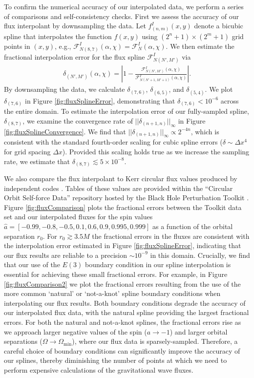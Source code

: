 \documentclass[%
 reprint,
 nofootinbib,
 amsmath,amssymb,
 aps,
 prd,
]{revtex4-2}
\begin{document}
To confirm the numerical accuracy of our interpolated data, we perform a series of comparisons and self-consistency checks. First we assess the accuracy of our flux interpolant by downsampling the data. Let $f^I_{(n,m)}(x,y)$ denote a bicubic spline that interpolates the function $f(x,y)$ using $(2^n+1) \times (2^m+1)$ grid points in $(x,y)$, e.g., $\mathcal{F}_{N(8,7)}^I(\alpha, \chi) = \mathcal{F}_N^I(\alpha, \chi) $. We then estimate the fractional interpolation error for the flux spline $\mathcal{F}_{N(N',M')}^I$ via
\begin{align}
    \delta_{(N',M')}(\alpha, \chi) = \left|1 - \frac{\mathcal{F}_{N(N',M')}^I(\alpha, \chi)}{\mathcal{F}_{N(N'+1,M'+1)}^I(\alpha, \chi)} \right|.
\end{align}
By downsampling the data, we calculate $\delta_{(7,6)}$, $\delta_{(6,5)}$, and $\delta_{(5,4)}$. We plot $\delta_{(7,6)}$ in Figure \ref{fig:fluxSplineError}, demonstrating that $\delta_{(7,6)}<10^{-6}$ across the entire domain. To estimate the interpolation error of our fully-sampled spline, $\delta_{(8,7)}$, we examine the convergence rate of $|| \delta_{(n+1,n)} ||_\infty$ in Figure \ref{fig:fluxSplineConvergence}. We find that $|| \delta_{(n+1,n)} ||_\infty \propto 2^{-4n}$, which is consistent with the standard fourth-order scaling for cubic spline errors ($\delta \sim \Delta x^4$ for grid spacing $\Delta x$). Provided this scaling holds true as we increase the sampling rate, we estimate that $\delta_{(8,7)} \lesssim 5\times 10^{-8}$.

We also compare the flux interpolant to Kerr circular flux values produced by independent codes \cite{TaraETC14, GralHughWarb16}. Tables of these values are provided within the ``Circular Orbit Self-force Data'' repository hosted by the Black Hole Perturbation Toolkit \cite{BHPTK18}. Figure \ref{fig:fluxComparison} plots the fractional errors between the Toolkit data set and our interpolated fluxes for the spin values $\hat{a} = [-0.99, -0.8, -0.5, 0.1, 0.6, 0.9, 0.995, 0.999]$ as a function of the orbital separation $r_0$. For $r_0 \gtrsim 3.5 M$ the fractional errors in the fluxes are consistent with the interpolation error estimated in Figure \ref{fig:fluxSplineError}, indicating that our flux results are reliable to a precision $\sim 10^{-9}$ in this domain. Crucially, we find that our use of the $E(3)$ boundary condition in our spline interpolation is essential for achieving these small fractional errors. For example, in Figure \ref{fig:fluxComparison2} we plot the fractional errors resulting from the use of the more common `natural' or `not-a-knot' spline boundary conditions when interpolating our flux results. Both boundary conditions degrade the accuracy of our interpolated flux data, with the natural spline providing the largest fractional errors. For both the natural and not-a-knot splines, the fractional errors rise as we approach larger negative values of the spin ($a \rightarrow -1$) and larger orbital separations ($\Omega \rightarrow \Omega_\mathrm{min}$), where our flux data is sparsely-sampled. Therefore, a careful choice of boundary conditions can significantly improve the accuracy of our splines, thereby diminishing the number of points at which we need to perform expensive calculations of the gravitational wave fluxes.
\end{document}
